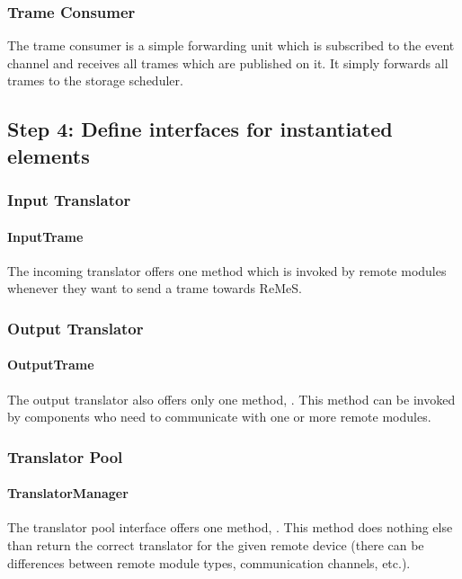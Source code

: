 \subsubsection{Trame Consumer}

\npar The trame consumer is a simple forwarding unit which is subscribed to the
event channel and receives all trames which are published on it. It simply
forwards all trames to the storage scheduler.

\subsection{Step 4: Define interfaces for instantiated elements}
\label{add:it2/interfaces}

\subsubsection{Input Translator}

\paragraph{InputTrame} %

\npar The incoming translator offers one method 
which is invoked by remote modules whenever they want to send a trame towards
ReMeS. 

\subsubsection{Output Translator}

\paragraph{OutputTrame}

\npar The output translator also offers only one method, .
This method can be invoked by components who need to communicate with one or
more remote modules.

\subsubsection{Translator Pool}

\paragraph{TranslatorManager}

\npar The translator pool interface offers one method,
. This method does nothing else than
return the correct translator for the given remote device (there can be
differences between remote module types, communication channels, etc.).

